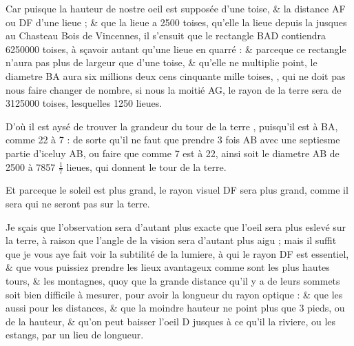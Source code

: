 \documentclass[11pt,a4paper]{article}
\begin{document}
Car puisque  la hauteur de nostre oeil est supposée d'une toise, \& la distance \add{\ill{}} \struck{\ill{}} AF ou DF d'une lieue ; \& que la lieue a 2500 toises,  qu'elle  la lieue depuis la  jusques au Chasteau  Bois de Vincennes, il s'ensuit que le rectangle BAD contiendra 6250000 toises, à sçavoir autant qu'une lieue en quarré : \& parceque ce rectangle n'aura pas plus de largeur que d'une toise, \& qu'elle ne multiplie point, le diametre BA aura six millions deux cens cinquante mille toises, , qui ne doit pas nous faire changer de nombre, \struck{\ill{}}  si nous \struck{\ill{}}  \struck{\ill{}} la moitié AG, le rayon de la terre sera de 3125000 toises, lesquelles  1250 lieues.

D'où il est aysé de trouver la grandeur du tour de la terre \struck{\ill{}} \add{\ill{}}  , puisqu'il \struck{\ill{}} est à BA, comme 22 à 7 : de sorte qu'il ne faut que prendre 3 fois AB avec une septiesme partie d'iceluy AB,  ou faire que comme 7 est à 22, ainsi soit le diametre AB de 2500 à 7857 $\frac{1}{7}$ lieues, qui donnent \struck{\ill{}} le tour de la terre.

Et parceque le soleil est plus grand, le rayon visuel DF sera plus grand, comme il sera  \ill{}  qui ne seront pas sur la terre. \struck{\ill{}}

Je sçais que l'observation sera d'autant plus exacte que l'oeil sera plus eslevé sur la terre, à raison que l'angle de la vision sera d'autant plus aigu ; mais il suffit que je vous aye fait voir la subtilité de la lumiere, à qui le rayon DF est essentiel, \& que vous puissiez prendre les lieux avantageux \struck{\ill{}} comme sont les plus hautes tours, \& les montagnes, quoy que la grande distance qu'il y a de leurs sommets soit bien difficile à mesurer, pour avoir la longueur du rayon optique : \& que les  \struck{\ill{}}  aussi pour  les distances, \struck{\ill{}} \& que la moindre hauteur ne  point plus  que 3 pieds, ou \ill{}  de la hauteur, \& qu'on peut baisser l'oeil D jusques à ce qu'il  la riviere, ou les estangs,  par un lieu de longueur.
\end{document}
